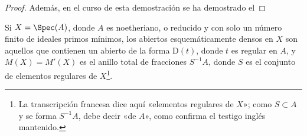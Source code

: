 \begin{proof}
Además, en el curso de esta demostración se ha demostrado el
\end{proof}

\begin{corollary}[20.2.12]
\label{IV.20.2.12}
Si $X=\Spec(A)$, donde $A$ es noetheriano, o reducido y con solo un número finito de ideales primos mínimos, los abiertos esquemáticamente densos en $X$ son aquellos que contienen un abierto de la forma $\mathrm{D}(t)$, donde $t$ es regular en $A$, y $M(X)=M'(X)$ es el anillo total de fracciones $S^{-1}A$, donde $S$ es el conjunto de elementos regulares de $X$\footnote{La transcripción francesa dice aquí «elementos regulares de $X$»; como $S\subset A$ y se forma $S^{-1}A$, debe decir «de $A$», como confirma el testigo inglés mantenido.}.
\end{corollary}

